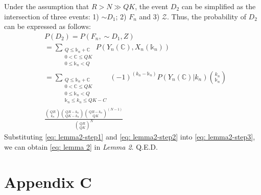 \documentclass[a4paper]{IEEEtran}
\begin{document}
Under the assumption that $R > N \gg QK$, the event $D_2$ can be simplified as the intersection of three events: 1) $\sim D_1$; 2) $F_n$ and 3) $\mathcal{Z}$. Thus, the probability of $D_2$ can be expressed as follows:
\begin{equation}
\begin{split}
& P (D_2)= P(F_n, \sim D_1, Z)\\
& = \sum\limits_{ \substack{
Q \leq \mathbb{k}_n + \mathbb{C}\\
0 < \mathbb{C} \leq QK \\
0 \leq \mathbb{k}_n < Q
}} P(Y_n(\mathbb{C}), X_n(\mathbb{k}_n))\\
& = \sum\limits_{ \substack{
Q \leq \mathbb{k}_n + \mathbb{C}\\
0 < \mathbb{C} \leq QK \\
0 \leq \mathbb{k}_n < Q\\
\mathbb{k}_n\leq k_n \leq QK-C
}}
(-1)^{(k_n - \mathbb{k}_n)} P(Y_n(\mathbb{C})|k_n){k_n \choose \mathbb{k}_n} \\
&\frac{{QR \choose k_n}{QR - k_n \choose QK - k_n}{QR - k_n \choose QK}^{(N-1)}}
{{QR \choose QK}^{N}}
\label{eq: lemma2-step3}
\end{split}
\end{equation}
Substituting \eqref{eq: lemma2-step1} and \eqref{eq: lemma2-step2} into
\eqref{eq: lemma2-step3}, we can obtain \eqref{eq: lemma 2} in \emph{Lemma 2}. Q.E.D.
\section*{Appendix C}
\end{document}
